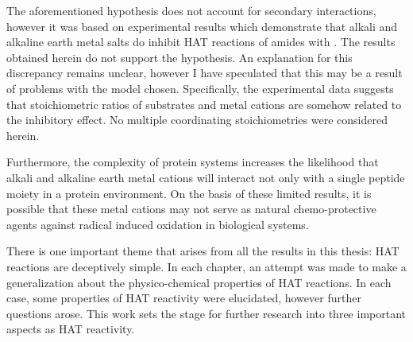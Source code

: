 \begin{doublespace}
The aforementioned hypothesis does not account for secondary interactions,
however it was based on experimental results which demonstrate that alkali and
alkaline earth metal salts do inhibit HAT reactions of amides with \cumo. The
results obtained herein do not support the hypothesis. An explanation for this
discrepancy remains unclear, however I have speculated that this may be a result
of problems with the model chosen. Specifically, the experimental data suggests
that stoichiometric ratios of substrates and metal cations are somehow related
to the inhibitory effect. No multiple coordinating stoichiometries were
considered herein.

Furthermore, the complexity of protein systems increases the likelihood that
alkali and alkaline earth metal cations will interact not only with a single
peptide moiety in a protein environment. On the basis of these limited results,
it is possible that these metal cations may not serve as natural
chemo-protective agents against radical induced oxidation in biological systems.

There is one important theme that arises from all the results in this thesis:
HAT reactions are deceptively simple. In each chapter, an attempt was made to
make a generalization about the physico-chemical properties of HAT reactions. In
each case, some properties of HAT reactivity were elucidated, however further
questions arose. This work sets the stage for further research into three
important aspects as HAT reactivity.


\end{doublespace}
